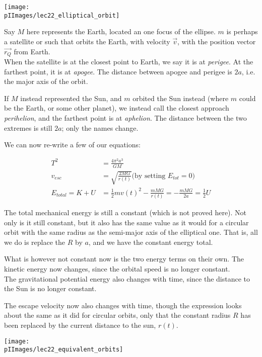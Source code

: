 \begin{center}
\texttt{[image: \\pIImages/lec22\_elliptical\_orbit]}
\end{center}

Say $M$ here represents the Earth, located an one focus of the ellipse. $m$ is perhaps a satellite or such that orbits the Earth, with velocity $\vec{v}$, with the position vector $\vec{r_Q}$ from Earth.\\
When the satellite is at the closest point to Earth, we say it is at \emph{perigee}. At the farthest point, it is at \emph{apogee}. The distance between apogee and perigee is $2a$, i.e. the major axis of the orbit.

If $M$ instead represented the Sun, and $m$ orbited the Sun instead (where $m$ could be the Earth, or some other planet), we instead call the closest approach \emph{perihelion}, and the farthest point is at \emph{aphelion}. The distance between the two extremes is still $2a$; only the names change.

We can now re-write a few of our equations:

\begin{align}
T^2 &= \frac{4 \pi^2 a^3}{G M}\\
v_{esc} &= \sqrt{\frac{2 M G}{r(t)}} \text{(by setting $E_{tot} = 0$)}\\
E_{total} = K + U &= \frac{1}{2} m v(t)^2 - \frac{m M G}{r(t)} = - \frac{m M G}{2a} = \frac{1}{2} U
\end{align}

The total mechanical energy is still a constant (which is not proved here). Not only is it still constant, but it also has the same value as it would for a circular orbit with the same radius as the semi-major axis of the elliptical one. That is, all we do is replace the $R$ by $a$, and we have the constant energy total.

What is however not constant now is the two energy terms on their own. The kinetic energy now changes, since the orbital speed is no longer constant.\\
The gravitational potential energy also changes with time, since the distance to the Sun is no longer constant.

The escape velocity now also changes with time, though the expression looks about the same as it did for circular orbits, only that the constant radius $R$ has been replaced by the current distance to the sun, $r(t)$.

\begin{center}
\texttt{[image: \\pIImages/lec22\_equivalent\_orbits]}
\end{center}


